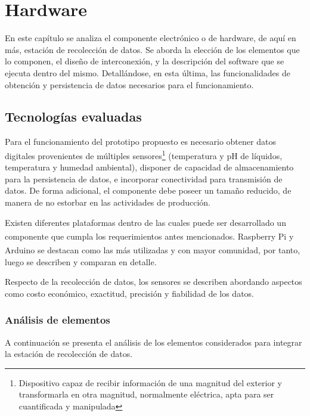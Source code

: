 \chapter{Hardware}
\label{CapituloHardware}
\par En este capítulo se analiza el componente electrónico o de hardware, de aquí en más, estación de recolección de datos. Se aborda la elección de los elementos que lo componen, el diseño de interconexión, y la descripción del software que se ejecuta dentro del mismo. Detallándose, en esta última, las funcionalidades de obtención y persistencia de datos necesarios para el funcionamiento.

\section{Tecnologías evaluadas}
\label{SeccionTecnoEvalHardware}
    \par Para el funcionamiento del prototipo propuesto es necesario obtener datos digitales provenientes de múltiples sensores\footnote{Dispositivo capaz de recibir información de una magnitud del exterior y transformarla en otra magnitud, normalmente eléctrica, apta para ser cuantificada y manipulada} (temperatura y pH de líquidos,  temperatura y humedad ambiental), disponer de capacidad de almacenamiento para la persistencia de datos, e incorporar conectividad para transmisión de datos. De forma adicional, el componente debe poseer un tamaño reducido, de manera de no estorbar en las actividades de producción.

    \par Existen diferentes plataformas dentro de las cuales puede ser desarrollado un componente que cumpla los requerimientos antes mencionados. Raspberry Pi\textsuperscript{\textregistered} y Arduino\textsuperscript{\textregistered} se destacan como las más utilizadas y con mayor comunidad, por tanto, luego se describen y comparan en detalle.
    
    \par Respecto de la recolección de datos, los sensores se describen abordando aspectos como costo económico, exactitud, precisión y fiabilidad de los datos.
    
    \subsection{Análisis de elementos}
    \par A continuación se presenta el análisis de los elementos considerados para integrar la estación de recolección de datos.
    

